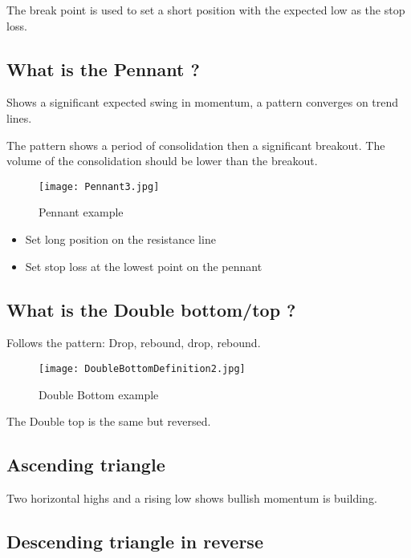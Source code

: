 \documentclass[11pt]{scrartcl} %
\begin{document}
The break point is used to set a short position with the expected low as the stop loss.

\subsection{What is the Pennant ?}

Shows a significant expected swing in momentum, a pattern converges on trend lines.

The pattern shows a period of consolidation then a significant breakout. The volume of the consolidation
should be lower than the breakout.

\begin{figure}[h] %
	\centering
	\texttt{[image: Pennant3.jpg]} %
	\caption{Pennant example}
\end{figure}

\begin{itemize}
	\item Set long position on the resistance line 
	\item Set stop loss at the lowest point on the pennant
\end{itemize}

\subsection{What is the Double bottom/top ?}

Follows the pattern: Drop, rebound, drop, rebound.

\begin{figure}[h] %
	\centering
	\texttt{[image: DoubleBottomDefinition2.jpg]} %
	\caption{Double Bottom example}
\end{figure}

The Double top is the same but reversed.

\subsection{Ascending triangle}

Two horizontal highs and a rising low shows bullish momentum is building.

\subsection{Descending triangle in reverse}
\end{document}
